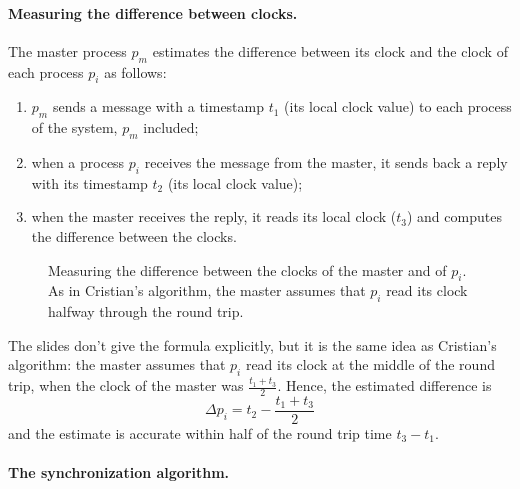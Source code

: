 \paragraph{Measuring the difference between clocks.} The master process $p_m$ estimates the difference between its clock and the clock of each process $p_i$ as follows:
\begin{enumerate}
  \item $p_m$ sends a message with a timestamp $t_1$ (its local clock value) to each process of the system, $p_m$ included;
  \item when a process $p_i$ receives the message from the master, it sends back a reply with its timestamp $t_2$ (its local clock value);
  \item when the master receives the reply, it reads its local clock ($t_3$) and computes the difference between the clocks.
\end{enumerate}

\begin{figure}[H]
  \centering
  \caption{Measuring the difference between the clocks of the master and of $p_i$. As in Cristian's algorithm, the master assumes that $p_i$ read its clock halfway through the round trip.}
  \label{fig:berkeley-measure}
\end{figure}

The slides don't give the formula explicitly, but it is the same idea as Cristian's algorithm: the master assumes that $p_i$ read its clock at the middle of the round trip, when the clock of the master was $\frac{t_1 + t_3}{2}$. Hence, the estimated difference is
\[\Delta p_i = t_2 - \frac{t_1 + t_3}{2}\]
and the estimate is accurate within half of the round trip time $t_3 - t_1$.

\paragraph{The synchronization algorithm.}

